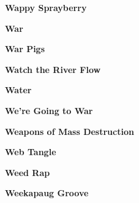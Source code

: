 \begin{center}\textbf{Wappy Sprayberry}\end{center}
\newline
\vspace{10pt} 
\begin{center}\textbf{War}\end{center}
\newline
\vspace{10pt} 
\begin{center}\textbf{War Pigs}\end{center}
\newline
\vspace{10pt} 
\begin{center}\textbf{Watch the River Flow}\end{center}
\newline
\vspace{10pt} 
\begin{center}\textbf{Water}\end{center}
\newline
\vspace{10pt} 
\begin{center}\textbf{We're Going to War}\end{center}
\newline
\vspace{10pt} 
\begin{center}\textbf{Weapons of Mass Destruction}\end{center}
\newline
\vspace{10pt} 
\begin{center}\textbf{Web Tangle}\end{center}
\newline
\vspace{10pt} 
\begin{center}\textbf{Weed Rap}\end{center}
\newline
\vspace{10pt} 
\begin{center}\textbf{Weekapaug Groove}\end{center}
\newline
